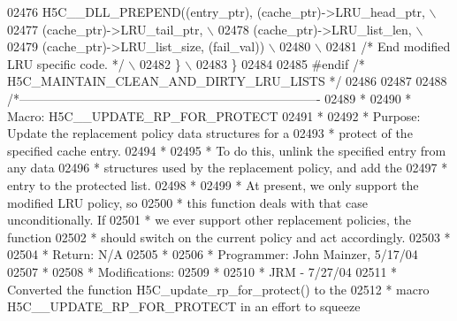 \begin{DoxyCode}
02476 \textcolor{preprocessor}{        H5C\_\_DLL\_PREPEND((entry\_ptr), (cache\_ptr)->LRU\_head\_ptr,           \(\backslash\)}
02477 \textcolor{preprocessor}{                         (cache\_ptr)->LRU\_tail\_ptr,                        \(\backslash\)}
02478 \textcolor{preprocessor}{             (cache\_ptr)->LRU\_list\_len,                        \(\backslash\)}
02479 \textcolor{preprocessor}{                         (cache\_ptr)->LRU\_list\_size, (fail\_val))           \(\backslash\)}
02480 \textcolor{preprocessor}{                                                                           \(\backslash\)}
02481 \textcolor{preprocessor}{        }\textcolor{comment}{/* End modified LRU specific code. */}\textcolor{preprocessor}{                              \(\backslash\)}
02482 \textcolor{preprocessor}{    \}                                                                      \(\backslash\)}
02483 \textcolor{preprocessor}{\}}
02484 
02485 \textcolor{preprocessor}{#endif }\textcolor{comment}{/* H5C\_MAINTAIN\_CLEAN\_AND\_DIRTY\_LRU\_LISTS */}\textcolor{preprocessor}{}
02486 
02487 
02488 \textcolor{comment}{/*-------------------------------------------------------------------------}
02489 \textcolor{comment}{ *}
02490 \textcolor{comment}{ * Macro:   H5C\_\_UPDATE\_RP\_FOR\_PROTECT}
02491 \textcolor{comment}{ *}
02492 \textcolor{comment}{ * Purpose:     Update the replacement policy data structures for a}
02493 \textcolor{comment}{ *      protect of the specified cache entry.}
02494 \textcolor{comment}{ *}
02495 \textcolor{comment}{ *      To do this, unlink the specified entry from any data}
02496 \textcolor{comment}{ *      structures used by the replacement policy, and add the}
02497 \textcolor{comment}{ *      entry to the protected list.}
02498 \textcolor{comment}{ *}
02499 \textcolor{comment}{ *      At present, we only support the modified LRU policy, so}
02500 \textcolor{comment}{ *      this function deals with that case unconditionally.  If}
02501 \textcolor{comment}{ *      we ever support other replacement policies, the function}
02502 \textcolor{comment}{ *      should switch on the current policy and act accordingly.}
02503 \textcolor{comment}{ *}
02504 \textcolor{comment}{ * Return:      N/A}
02505 \textcolor{comment}{ *}
02506 \textcolor{comment}{ * Programmer:  John Mainzer, 5/17/04}
02507 \textcolor{comment}{ *}
02508 \textcolor{comment}{ * Modifications:}
02509 \textcolor{comment}{ *}
02510 \textcolor{comment}{ *      JRM - 7/27/04}
02511 \textcolor{comment}{ *      Converted the function H5C\_update\_rp\_for\_protect() to the}
02512 \textcolor{comment}{ *      macro H5C\_\_UPDATE\_RP\_FOR\_PROTECT in an effort to squeeze}

\end{DoxyCode}
